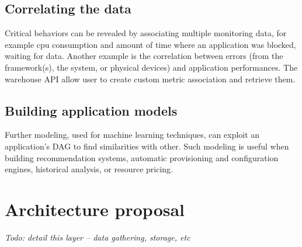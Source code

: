 \documentclass[12pt,twocolumn]{article}
\begin{document}
  \subsection{Correlating the data}
    Critical behaviors can be revealed by associating multiple monitoring data, for example cpu
    consumption and amount of time where an application was blocked, waiting for data. Another
    example is the correlation between errors (from the framework(s), the system, or physical
    devices) and application performances. The warehouse API allow user to create custom metric
    association and retrieve them.
  \subsection{Building application models}
    Further modeling, used for machine learning techniques, can exploit an application's DAG to
    find similarities with other. Such modeling is useful when building recommendation systems,
    automatic provisioning and configuration engines, historical analysis, or resource pricing.

\section{Architecture proposal}

  {\itshape Todo: detail this layer -- data gathering, storage, etc}
\end{document}
